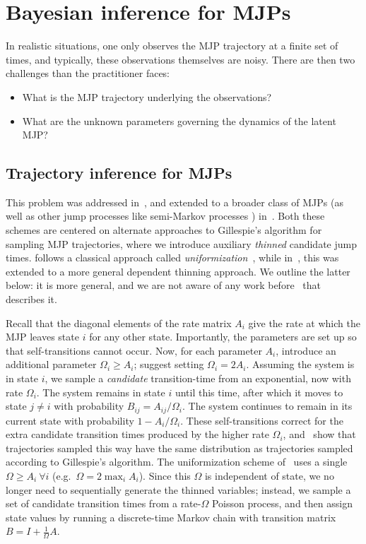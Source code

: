 
\section{Bayesian inference for MJPs}
In realistic situations, one only observes the MJP trajectory at
a finite set of times, and typically, these observations themselves
are noisy. There are then two challenges than the practitioner faces:
\begin{itemize}
  \item What is the MJP trajectory underlying the observations?
  \item What are the unknown parameters governing the dynamics of the 
    latent MJP?
\end{itemize}

\subsection{Trajectory inference for MJPs}
This problem was addressed in~\cite{RaoTeh13}, and extended to a broader 
class of MJPs (as well as other jump processes like semi-Markov processes
) in~\cite{RaoTeh12}. Both these schemes are centered on alternate
approaches to Gillespie's algorithm for sampling MJP trajectories, where we
introduce auxiliary {\em thinned} candidate jump times. 
\cite{RaoTeh13} follows a classical approach called 
{\em uniformization}~\cite{Jen1953}, while in~\cite{RaoTeh12}, this was
extended to a more general dependent thinning approach. We outline
the latter below: it is more general, and we are not aware of any work
before~\cite{RaoTeh12} that describes it.

Recall that the diagonal elements of the rate matrix $A_i$ give the 
rate at which the MJP leaves state $i$ for any other state. Importantly,
the parameters are set up so that self-transitions cannot occur. Now,
for each parameter $A_i$, introduce an additional parameter $\Omega_i \ge A_i$;
\cite{RaoTeh12} suggest setting $\Omega_i = 2 A_i$. Assuming the system is
in state $i$, we sample a {\em candidate} transition-time from an
exponential, now with rate $\Omega_i$. The system remains in state $i$
until this time, after which it moves to state $j \neq i$ with probability
$B_{ij} = A_{ij}/\Omega_i$. The system continues to remain in its current 
state with probability $1-A_i/\Omega_i$. 
These self-transitions correct for the extra candidate transition times
produced by the higher rate $\Omega_i$, and~\cite{RaoTeh12} show that
trajectories sampled this way have the same distribution as trajectories
sampled according to Gillespie's algorithm. The uniformization
scheme of~\cite{Jen1953,RaoTeh13} uses a single $\Omega \ge A_i\  \forall i$
(e.g.\ $\Omega = 2 \max_i A_i$). Since this $\Omega$ is independent of
state, we no longer need to sequentially generate the thinned variables;
instead, we sample a set of candidate transition times from a rate-$\Omega$
Poisson process, and then assign state values by running a 
discrete-time Markov chain with transition matrix $B = I + \frac{1}{\Omega}A$.


